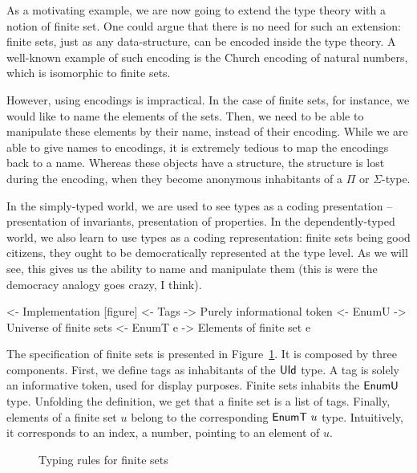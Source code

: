 As a motivating example, we are now going to extend the type theory
with a notion of finite set. One could argue that there is no need for
such an extension: finite sets, just as any data-structure, can be
encoded inside the type theory. A well-known example of such encoding
is the Church encoding of natural numbers, which is isomorphic to
finite sets. 


However, using encodings is impractical. In the case of finite sets,
for instance, we would like to name the elements of the sets. Then, we
need to be able to manipulate these elements by their name, instead of
their encoding. While we are able to give names to encodings, it is
extremely tedious to map the encodings back to a name. Whereas these
objects have a structure, the structure is lost during the encoding,
when they become anonymous inhabitants of a $Π$ or $Σ$-type.

In the simply-typed world, we are used to see types as a coding
presentation -- presentation of invariants, presentation of
properties. In the dependently-typed world, we also learn to use types
as a coding representation: finite sets being good citizens, they
ought to be democratically represented at the type level. As we will
see, this gives us the ability to name and manipulate them (this is
were the democracy analogy goes crazy, I think).

\begin{wstructure}
<- Implementation [figure]      
    <- Tags
        -> Purely informational token
    <- EnumU
        -> Universe of finite sets
    <- EnumT e
        -> Elements of finite set e
\end{wstructure}

The specification of finite sets is presented in
Figure~\ref{fig:typing-finite-set}. It is composed by three
components. First, we define tags as inhabitants of the $\UId$ type. A
tag is solely an informative token, used for display purposes. Finite
sets inhabits the $\EnumU$ type. Unfolding the definition, we get that
a finite set is a list of tags. Finally, elements of a finite set $u$
belong to the corresponding $\EnumT{u}$ type. Intuitively, it
corresponds to an index, a number, pointing to an element of $u$.

\begin{figure}



\caption{Typing rules for finite sets}
\label{fig:typing-finite-set}

\end{figure}


